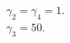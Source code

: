 \documentclass[preview]{standalone}
\begin{document}
\begin{center}
$\gamma_2 = \gamma_4 = 1.$\\$\gamma_3 = 50.$
\end{center}
\end{document}
